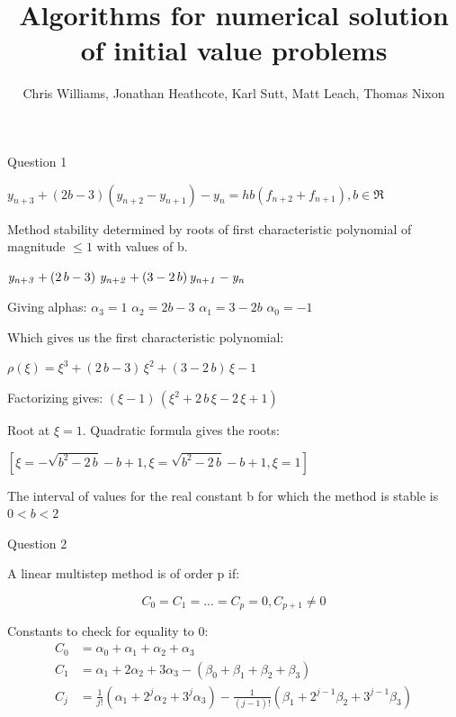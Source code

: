 \documentclass{beamer}
\title{Algorithms for numerical solution of initial value problems}
\author{Chris Williams, Jonathan Heathcote, Karl Sutt, Matt Leach, Thomas Nixon}
\begin{document}
\begin{frame}
	\titlepage
\end{frame}
\begin{frame}{Question 1}

$y_{n+3} + (2b - 3)(y_{n+2} - y_{n+1}) - y_n = hb(f_{n+2} + f_{n+1}), b \in \Re$

Method stability determined by roots of first characteristic polynomial of magnitude $\le 1$ with values of b.

${\it y_{n+3}}+\left(2\,b-3\right)\,{\it y_{n+2}}+\left(3-2\,b\right) {\it y_{n+1}}-{\it y_n}$

Giving alphas: $\alpha_3 = 1$ $\alpha_2 = 2b - 3$ $\alpha_1 = 3 - 2b$ $\alpha_0 = -1$

Which gives us the first characteristic polynomial:

$\rho(\xi) = \xi^3+\left(2\,b-3\right)\,\xi^2+\left(3-2\,b\right)\,\xi-1$

Factorizing gives: $\left(\xi-1\right)\,\left(\xi^2+2\,b\,\xi-2\,\xi+1\right)$

Root at $\xi = 1$. Quadratic formula gives the roots:

$\left[ \xi=-\sqrt{b^2-2\,b}-b+1 , \xi=\sqrt{b^2-2\,b}-b+1 , \xi=1 \right]$

The interval of values for the real constant b for which the method is stable is $0 < b < 2$
\end{frame}

\begin{frame}{Question 2}

A linear multistep method is of order p if:

$$C_0 = C_1 = ... = C_p = 0, C_{p+1} \ne 0$$

Constants to check for equality to 0:
\begin{align*}
C_0 &= \alpha_0 + \alpha_1 + \alpha_2 + \alpha_3\\
C_1 &= \alpha_1 + 2\alpha_2 + 3\alpha_3 - (\beta_0 + \beta_1 + \beta_2 + \beta_3)\\
	C_j &= \frac{1}{j!} (\alpha_1 + 2^j\alpha_2 + 3^j\alpha_3) - \frac{1}{(j-1)!} (\beta_1 + 2^{j-1}\beta_2 + 3^{j-1}\beta_3)
\end{align*}

\end{frame}
\end{document}
